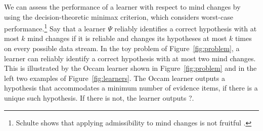 \documentclass{elsarticle}%
\newcommand{\learnera}{\Psi}
\begin{document}
We can assess the performance of a learner with respect to mind changes by using the decision-theoretic minimax criterion, which considers worst-case performance.\footnote{Schulte shows that applying admissibility to mind changes is not fruitful \cite{bib:bjps}.} Say that a learner $\learnera$ reliably identifies a correct hypothesis with at most $k$ mind changes if it is reliable and changes its hypotheses at most $k$ times on every possible data stream. In the toy problem of Figure~\ref{fig:problem}, a learner can reliably identify a correct hypothesis with at most two mind changes. This is illustrated by the Occam learner shown in Figure~\ref{fig:problem} and in the left two examples of Figure~\ref{fig:learners}. The Occam learner outputs a hypothesis that accommodates a minimum number of evidence items, if there is a unique such hypothesis. If there is not, the learner outputs ?.
\end{document}
